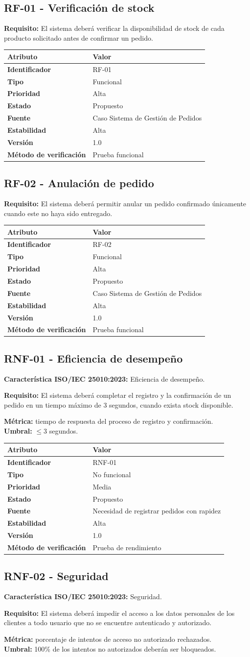 \documentclass[12pt,a4paper]{article}
\newcommand{\reqtable}[7]{%
\begin{center}
\renewcommand{\arraystretch}{1.25}
\begin{tabularx}{0.95\textwidth}{|>{\bfseries}p{4.0cm}|X|}
\hline
\rowcolor{lightblue} Atributo & Valor \\
\hline
Identificador & #1 \\
\hline
Tipo & #2 \\
\hline
Prioridad & #3 \\
\hline
Estado & #4 \\
\hline
Fuente & #5 \\
\hline
Estabilidad & #6 \\
\hline
Versión & 1.0 \\
\hline
Método de verificación & #7 \\
\hline
\end{tabularx}
\end{center}}
\begin{document}
\subsection{RF-01 - Verificación de stock}
\textbf{Requisito:} El sistema deberá verificar la disponibilidad de stock de cada producto solicitado antes de confirmar un pedido.

\reqtable{RF-01}{Funcional}{Alta}{Propuesto}{Caso Sistema de Gestión de Pedidos}{Alta}{Prueba funcional}

\subsection{RF-02 - Anulación de pedido}
\textbf{Requisito:} El sistema deberá permitir anular un pedido confirmado únicamente cuando este no haya sido entregado.

\reqtable{RF-02}{Funcional}{Alta}{Propuesto}{Caso Sistema de Gestión de Pedidos}{Alta}{Prueba funcional}

\subsection{RNF-01 - Eficiencia de desempeño}
\textbf{Característica ISO/IEC 25010:2023:} Eficiencia de desempeño.

\textbf{Requisito:} El sistema deberá completar el registro y la confirmación de un pedido en un tiempo máximo de 3 segundos, cuando exista stock disponible.

\textbf{Métrica:} tiempo de respuesta del proceso de registro y confirmación.\\
\textbf{Umbral:} $\leq 3$ segundos.

\reqtable{RNF-01}{No funcional}{Media}{Propuesto}{Necesidad de registrar pedidos con rapidez}{Alta}{Prueba de rendimiento}

\subsection{RNF-02 - Seguridad}
\textbf{Característica ISO/IEC 25010:2023:} Seguridad.

\textbf{Requisito:} El sistema deberá impedir el acceso a los datos personales de los clientes a todo usuario que no se encuentre autenticado y autorizado.

\textbf{Métrica:} porcentaje de intentos de acceso no autorizado rechazados.\\
\textbf{Umbral:} 100\% de los intentos no autorizados deberán ser bloqueados.
\end{document}
